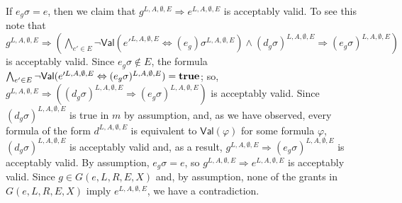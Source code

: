 \documentclass{acmtrans2m}
\newcommand{\rimp}{\Rightarrow}
\newcommand{\<}{
}
\renewcommand{\>}{\rangle}
\renewcommand{\phi}{\varphi}
\newcommand{\true}{\mathit{\bf{true}}}
\newcommand{\cd}{d}
\newcommand{\cc}{e}
\newcommand{\scc}{E}
\newcommand{\Val}{\mathsf{Val}}
\newcommand{\Eql}[2]{\mathsf{Val}(#1 \iff #2)}
\newcommand{\transwithE}[5]{#1^{#2, #3, #4, #5}}
\renewcommand{\iff}{\Leftrightarrow}
\newcommand{\EX}{X}
\begin{document}
If $\cc_g\sigma = \cc$, then we claim that $\transwithE{g}{L}{A}{\emptyset}{\scc}
\rimp\transwithE{\cc}{L}{A}{\emptyset}{\scc}$ is acceptably valid.  To
see this note that 
$\transwithE{g}{L}{A}{\emptyset}{\scc}\rimp(\bigwedge_{\cc'\in\scc}\neg\Eql{\transwithE{\cc'}{L}{A}{\emptyset}{\scc}}{\transwithE{(\cc_g)\sigma}{L}{A}{\emptyset}{\scc}}\land \transwithE{(\cd_g\sigma)}{L}{A}{\emptyset}{\scc}\rimp\transwithE{(\cc_g\sigma)}{L}{A}{\emptyset}{\scc})$ is acceptably valid.
Since $\cc_g\sigma\not\in\scc$, the formula
$\bigwedge_{\cc'\in\scc}\neg\Eql{\transwithE{\cc'}{L}{A}{\emptyset}{\scc}}{\transwithE{(\cc_g\sigma)}{L}{A}{\emptyset}{\scc}}
= \true$; so,
$\transwithE{g}{L}{A}{\emptyset}{\scc}\rimp(\transwithE{(\cd_g\sigma)}{L}{A}{\emptyset}{\scc}\rimp\transwithE{(\cc_g\sigma)}{L}{A}{\emptyset}{\scc})$
is acceptably valid.  Since $\transwithE{(\cd_g\sigma)}{L}{A}{\emptyset}{\scc}$ is true in $m$ by
assumption, and, as we have observed, every formula of the form $\transwithE{\cd}{L}{A}{\emptyset}{\scc}$
is equivalent to $\Val(\phi)$ for some formula $\phi$, $\transwithE{(\cd_g\sigma)}{L}{A}{\emptyset}{\scc}$
is acceptably valid and, as a result,
$\transwithE{g}{L}{A}{\emptyset}{\scc}\rimp\transwithE{(\cc_g\sigma)}{L}{A}{\emptyset}{\scc}$ is
acceptably valid.  By assumption, $\cc_g\sigma = \cc$, so
$\transwithE{g}{L}{A}{\emptyset}{\scc}\rimp\transwithE{\cc}{L}{A}{\emptyset}{\scc}$ is acceptably valid.
Since $g\in G(\cc, L, R, \scc, \EX)$ and, by assumption, none of the grants in $G(\cc, L, R, \scc, \EX)$
imply $\transwithE{\cc}{L}{A}{\emptyset}{\scc}$, we have a contradiction.
\end{document}
